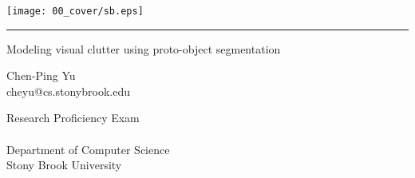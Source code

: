 
\newcommand{\logosb}[0]{\begin{center}\texttt{[image: 00\_cover/sb.eps]}\end{center}\vspace{0.2cm}\hrule}
\newcommand{\logolabos}[0] {\begin{center}\texttt{[image: 00\_cover/darlab.eps]}\end{center}}

\renewcommand{\title}[1]{\vspace{3cm}\begin{center}\huge{#1}\end{center}\vspace{1.7cm}}
\renewcommand{\author}[2]{\begin{center}\Large{#1}\\ \large{#2}\end{center}\vspace{0.3cm}}
\newcommand{\department}[1]{\begin{center}\large{#1}\end{center}}

\renewcommand{\date}[2]{\begin{center}\normalsize{#1 #2}\end{center}}

\newcommand{\supervisor}[5]{\begin{center}\begin{normalsize}{\bf #1}\\#2\\#3\\#4\\#5\end{normalsize}\end{center}}

\thispagestyle{empty}

\logosb
\title{Modeling visual clutter using proto-object segmentation}
\author{Chen-Ping Yu}{cheyu@cs.stonybrook.edu}
\department{Research Proficiency Exam\\\ \\Department of Computer Science\\Stony Brook University}


